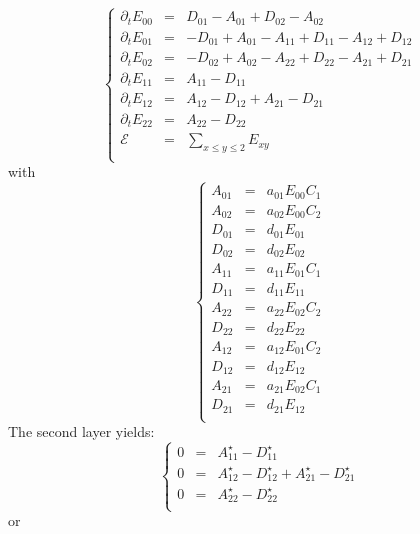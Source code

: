 \documentclass[aps,onecolumn,12pt]{revtex4}
\begin{document}
\begin{equation}
\left\lbrace
\begin{array}{rcl}
\partial_t E_{00} & = & D_{01}-A_{01} + D_{02}-A_{02}\\
\partial_t E_{01} & = & -D_{01}+A_{01} - A_{11} + D_{11} - A_{12} + D_{12}\\
\partial_t E_{02} & = & -D_{02}+A_{02} - A_{22} + D_{22} - A_{21} + D_{21}\\
\partial_t E_{11} & = & A_{11}-D_{11}\\
\partial_t E_{12} & = & A_{12}-D_{12} + A_{21}-D_{21}\\
\partial_t E_{22} & = & A_{22}-D_{22}\\
\mathcal{E}       & = & {\displaystyle \sum_{x\leq y\leq 2} E_{xy}}\\
\end{array}
\right.
\end{equation}
with
\begin{equation}
\left\lbrace
\begin{array}{rcl}
A_{01} &= &a_{01} E_{00} C_1\\
A_{02} &= &a_{02} E_{00} C_2\\
D_{01} &= &d_{01} E_{01}\\
D_{02} &= &d_{02} E_{02}\\
A_{11} &= & a_{11} E_{01} C_1 \\
D_{11} &= &d_{11} E_{11}\\
A_{22} &= &a_{22} E_{02} C_2 \\
D_{22} &= &d_{22} E_{22}\\
A_{12} & = & a_{12} E_{01} C_2\\
D_{12} & = & d_{12} E_{12}\\
A_{21} & = & a_{21} E_{02} C_1\\
D_{21} & = & d_{21} E_{12}\\
\end{array}
\right.
\end{equation}
The second layer yields:
\begin{equation}
\left\lbrace
\begin{array}{rcl}
0 & = & A_{11}^\star-D_{11}^\star\\
0 & = & A_{12}^\star-D_{12}^\star + A_{21}^\star-D_{21}^\star\\
0 & = & A_{22}^\star-D_{22}^\star\\
\end{array}
\right.
\end{equation}
or
\end{document}
